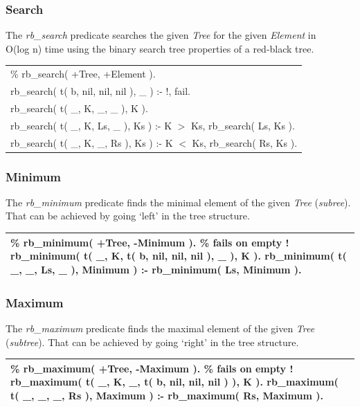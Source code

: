 \documentclass{article}
\newenvironment{code}{\obeycr\begin{it}\nopagebreak\addvspace{1ex}\noindent\footnotesize\begin{tabular}{|p{0.95\textwidth}|}\hline}{\\\hline\end{tabular}\par\addvspace{1ex}\end{it}\restorecr}
\newcommand{\inlinecode}[1]{\textit{#1}}
\begin{document}
\subsubsection{Search}
The \inlinecode{rb\_search} predicate searches the given \inlinecode{Tree} for the given \inlinecode{Element} in \\O(log n) time using the binary search tree properties of a red-black tree.

\begin{code}
\% rb\_search( +Tree, +Element ).\\
rb\_search( t( b, nil, nil, nil ), \_ ) :- !, fail.\\
rb\_search( t( \_, K, \_, \_ ), K ).\\
rb\_search( t( \_, K, Ls, \_ ), Ks ) :-
\hspace{2ex}K $>$ Ks,
\hspace{2ex}rb\_search( Ls, Ks ).\\
rb\_search( t( \_, K, \_, Rs ), Ks ) :-
\hspace{2ex}K $<$ Ks,
\hspace{2ex}rb\_search( Rs, Ks ).
\end{code}

\subsubsection{Minimum}
The \inlinecode{rb\_minimum} predicate finds the minimal element of the given \inlinecode{Tree} (\inlinecode{subree}). That can be achieved by going `left' in the tree structure.

\begin{code}
\% rb\_minimum( +Tree, -Minimum ).
\% fails on empty !
rb\_minimum( t( \_, K, t( b, nil, nil, nil ), \_ ), K ).
rb\_minimum( t( \_, \_, Ls, \_ ), Minimum ) :-
\hspace{2ex}rb\_minimum( Ls, Minimum ).
\end{code}

\subsubsection{Maximum}
The \inlinecode{rb\_maximum} predicate finds the maximal element of the given \inlinecode{Tree} (\inlinecode{subtree}). That can be achieved by going `right' in the tree structure.

\begin{code}
\% rb\_maximum( +Tree, -Maximum ).
\% fails on empty !
rb\_maximum( t( \_, K, \_, t( b, nil, nil, nil ) ), K ).
rb\_maximum( t( \_, \_, \_, Rs ), Maximum ) :-
\hspace{2ex}rb\_maximum( Rs, Maximum ).
\end{code}
\end{document}
